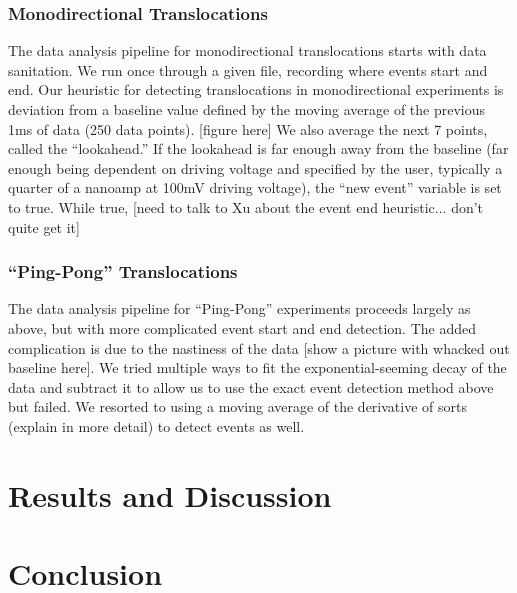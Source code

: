 \documentclass[aps,prl,preprint,groupedaddress]{revtex4}
\begin{document}
\subsubsection{Monodirectional Translocations}

The data analysis pipeline for monodirectional translocations starts with data sanitation. We run once through a given file, recording where events start and end. Our heuristic for detecting translocations in monodirectional experiments is deviation from a baseline value defined by the moving average of the previous 1ms of data (250 data points). [figure here] We also average the next 7 points, called the ``lookahead.'' If the lookahead is far enough away from the baseline (far enough being dependent on driving voltage and specified by the user, typically a quarter of a nanoamp at 100mV driving voltage), the ``new event'' variable is set to true. While true, [need to talk to Xu about the event end heuristic... don't quite get it]

\subsubsection{``Ping-Pong'' Translocations}

The data analysis pipeline for ``Ping-Pong'' experiments proceeds largely as above, but with more complicated event start and end detection. The added complication is due to the nastiness of the data [show a picture with whacked out baseline here]. We tried multiple ways to fit the exponential-seeming decay of the data and subtract it to allow us to use the exact event detection method above but failed. We resorted to using a moving average of the derivative of sorts (explain in more detail) to detect events as well.

\section{Results and Discussion}



\section{Conclusion}


\end{document}
